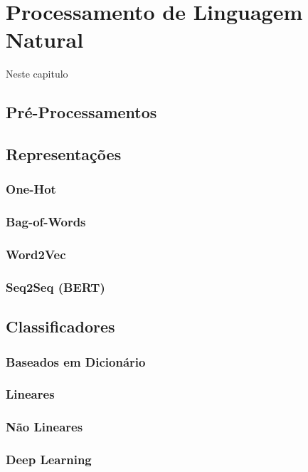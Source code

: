 \chapter{Processamento de Linguagem Natural}
\label{chapter:nlp}

Neste capitulo
\section{Pré-Processamentos}
\section{Representações}
\subsection{One-Hot}
\subsection{Bag-of-Words}
\subsection{Word2Vec}
\subsection{Seq2Seq (BERT)}
\section{Classificadores}
\subsection{Baseados em Dicionário}
\label{sec:dictionary}
\subsection{Lineares}
\subsection{Não Lineares}
\subsection{Deep Learning}

